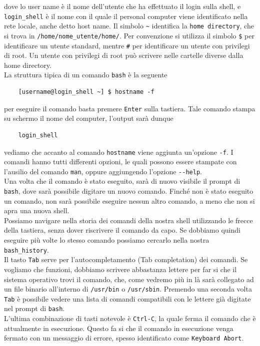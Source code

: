 \documentclass[11pt]{book}
\begin{document}
dove lo user name è il nome dell'utente che ha effettuato il login sulla shell, e \verb"login_shell" è il nome con il quale il personal computer viene identificato nella rete locale, anche detto host name. Il simbolo \verb"~" identifica la \verb"home directory", che si trova in \verb"/home/nome_utente/home/". Per convenzione si utilizza il simbolo \verb"$" per identificare un utente standard, mentre \verb"#" per identificare un utente con privilegi di root. Un utente con privilegi di root può scrivere nelle cartelle diverse dalla home directory.\\
La struttura tipica di un comando \verb"bash" è la seguente
\begin{verbatim}
	[username@login_shell ~] $ hostname -f
\end{verbatim}
per eseguire il comando basta premere \verb"Enter" sulla tastiera. Tale comando stampa su schermo il nome del computer, l'output sarà dunque
\begin{verbatim}
	login_shell
\end{verbatim}
vediamo che accanto al comando \verb"hostname" viene aggiunta un'opzione \verb"-f". I comandi hanno tutti differenti opzioni, le quali possono essere stampate con l'ausilio del comando \verb"man", oppure aggiungendo l'opzione \verb"--help".\\
Una volta che il comando è stato eseguito, sarà di nuovo visibile il prompt di \verb"bash", dove sarà possibile digitare un nuovo comando. Finché non è stato eseguito un comando, non sarà possibile eseguire nessun altro comando, a meno che non si apra una nuova shell.\\
Possiamo navigare nella storia dei comandi della nostra shell utilizzando le frecce della tastiera, senza dover riscrivere il comando da capo. Se dobbiamo quindi eseguire più volte lo stesso comando possiamo cercarlo nella nostra \verb"bash_history".\\
Il tasto \verb"Tab" serve per l'autocompletamento (Tab completation) dei comandi. Se vogliamo che funzioni, dobbiamo scrivere abbastanza lettere per far si che il sistema operativo trovi il comando, che, come vedremo più in là sarà collegato ad un file binario all'interno di \verb"/usr/bin" o \verb"/usr/sbin". Premendo una seconda volta \verb"Tab" è possibile vedere una lista di comandi compatibili con le lettere già digitate nel prompt di \verb"bash". \\
L'ultima combinazione di tasti notevole è \verb"Ctrl-C", la quale ferma il comando che è attualmente in esecuzione. Questo fa si che il comando in esecuzione venga fermato con un messaggio di errore, spesso identificato come \verb"Keyboard Abort". \\
\end{document}
